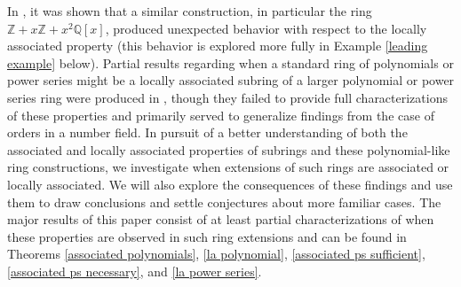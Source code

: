 \documentclass[12pt]{amsart}
\theoremstyle{definition}
\newcommand{\bZ}{\mathbb Z}
\newcommand{\bQ}{\mathbb Q}
\begin{document}
In \cite{subringrelations}, it was shown that a similar construction, in particular the ring $\bZ+x\bZ+x^2\bQ[x]$, produced unexpected behavior with respect to the locally associated property (this behavior is explored more fully in Example \ref{leading example} below). Partial results regarding when a standard ring of polynomials or power series might be a locally associated subring of a larger polynomial or power series ring were produced in \cite[Theorems 4.1-4.3]{subringrelations}, though they failed to provide full characterizations of these properties and primarily served to generalize findings from the case of orders in a number field. In pursuit of a better understanding of both the associated and locally associated properties of subrings and these polynomial-like ring constructions, we investigate when extensions of such rings are associated or locally associated. We will also explore the consequences of these findings and use them to draw conclusions and settle conjectures about more familiar cases. The major results of this paper consist of at least partial characterizations of when these properties are observed in such ring extensions and can be found in Theorems \ref{associated polynomials}, \ref{la polynomial}, \ref{associated ps sufficient}, \ref{associated ps necessary}, and \ref{la power series}.
\end{document}
